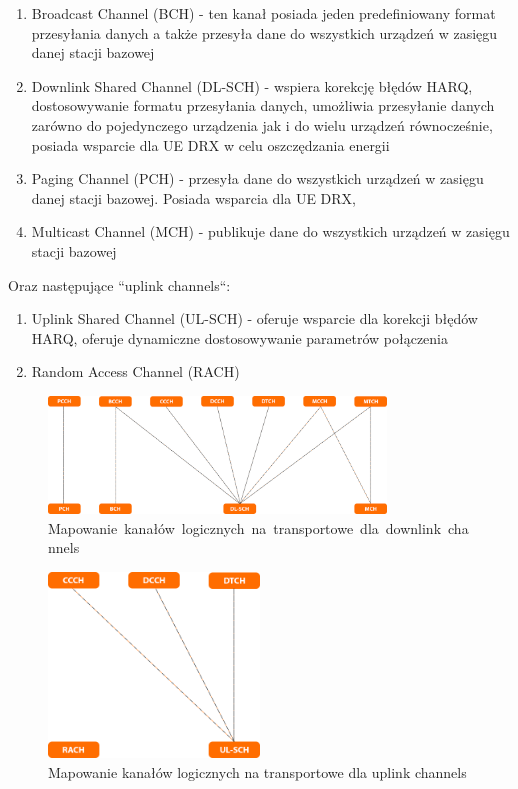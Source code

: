 \begin{enumerate}
	\item Broadcast Channel (BCH) - ten kanał posiada jeden predefiniowany format przesyłania danych a także przesyła dane do wszystkich urządzeń w zasięgu danej stacji bazowej
	\item Downlink Shared Channel (DL-SCH) - wspiera korekcję błędów HARQ, dostosowywanie formatu przesyłania danych, umożliwia przesyłanie danych zarówno do pojedynczego urządzenia jak i do wielu urządzeń równocześnie, posiada wsparcie dla UE DRX w celu oszczędzania energii
	\item Paging Channel (PCH) - przesyła dane do wszystkich urządzeń w zasięgu danej stacji bazowej. Posiada wsparcia dla UE DRX, 
	\item Multicast Channel (MCH) - publikuje dane do wszystkich urządzeń w zasięgu stacji bazowej
\end{enumerate}

Oraz następujące ``uplink channels``:

\begin{enumerate}
	\item Uplink Shared Channel (UL-SCH) - oferuje wsparcie dla korekcji błędów HARQ, oferuje dynamiczne dostosowywanie parametrów połączenia 
	\item Random Access Channel (RACH)
\end{enumerate}

\begin{figure}
	\centerline{\includegraphics[width=0.8\textwidth]{images/mac_downlink_mapping.png}}
	\caption{\mbox{Mapowanie kanałów logicznych na transportowe dla downlink channels}}
	\label{fig:mac_downlink_mapping}
\end{figure}

\begin{figure}
	\centerline{\includegraphics[width=0.5\textwidth]{images/mac_uplink_mapping.png}}
	\caption{Mapowanie kanałów logicznych na transportowe dla uplink channels}
	\label{fig:mac_uplink_mapping}
\end{figure}

